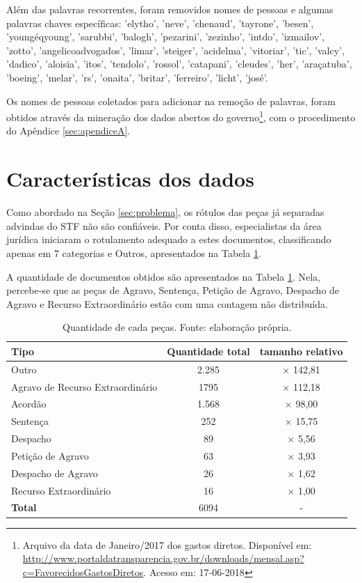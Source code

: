 Além das palavras recorrentes, foram removidos nomes de pessoas e algumas palavras chaves específicas: 'elytho', 'neve', 'chenaud', 'tayrone', 'besen', 'youngéqyoung', 'sarubbi', 'balogh', 'pezarini', 'zezinho', 'intdo', 'izmailov', 'zotto', 'angelicoadvogados', 'limar', 'steiger', 'acidelma', 'vitoriar', 'tic', 'valcy', 'dadico', 'aloisia', 'itos', 'tendolo', 'rossol', 'catapani', 'cleudes', 'her', 'araçatuba', 'boeing', 'melar', 'rs', 'onaita', 'britar', 'ferreiro', 'licht', 'josé'.

Os nomes de pessoas coletados para adicionar na remoção de palavras, foram obtidos através da mineração dos dados abertos do governo\footnote{Arquivo da data de Janeiro/2017 dos gastos diretos. Disponível em: \url{http://www.portaldatransparencia.gov.br/downloads/mensal.asp?c=FavorecidosGastosDiretos}. Acesso em: 17-06-2018}, com o procedimento do Apêndice \ref{sec:apendiceA}. 

\section{Características dos dados}

Como abordado na Seção \ref{sec:problema}, os rótulos das peças já separadas advindas do STF não são confiáveis. Por conta disso, especialistas da área jurídica iniciaram o rotulamento adequado a estes documentos, classificando apenas em 7 categorias e Outros, apresentados na Tabela \ref{tab:categoriasPecas}.

A quantidade de documentos obtidos são apresentados na Tabela \ref{tab:categoriasPecas}. Nela, percebe-se que as peças de Agravo, Sentença, Petição de Agravo, Despacho de Agravo e Recurso Extraordinário estão com uma contagem não distribuída.

\begin{table}[h]
	\centering    
	\caption[Quantidade de cada peças]{Quantidade de cada peças. Fonte: elaboração própria.}
    \label{tab:categoriasPecas}
	\begin{tabular}{|l|c|c|}
    \hline
    \textbf{Tipo} & \textbf{Quantidade total} & \textbf{tamanho relativo} \\ 
    \hline
    Outro &  2.285 & $\times$ 142,81  \\
    \hline
    Agravo de Recurso Extraordinário & 1795 & $\times$  112,18  \\
    \hline
    Acordão & 1.568 & $\times$ 98,00  \\
    \hline
    Sentença & 252 & $\times$ 15,75  \\
    \hline
    Despacho & 89 & $\times$ 5,56  \\
    \hline
    Petição de Agravo & 63 & $\times$ 3,93  \\
    \hline
    Despacho de Agravo & 26 & $\times$ 1,62  \\
    \hline
    Recurso Extraordinário & 16 & $\times$ 1,00  \\
    \hline
    \textbf{Total} & 6094 & - \\
    \hline

    \end{tabular}
\end{table}

